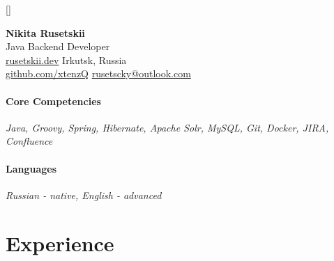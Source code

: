 \documentclass[10pt]{article}
\begin{document}
\titleformat{\section}{\vspace{-8pt}\scshape\raggedright\Large}{}{0em}{}[\color{black}\titlerule \vspace{-8pt}]


\noindent
\Large{\textbf{Nikita Rusetskii}}\vspace{4pt}
\\
\large{Java Backend Developer}\vspace{4pt}
\\
\normalsize\href{https://rusetskii.dev/}{rusetskii.dev}\normalsize
\hfill Irkutsk, Russia
\\
\href{https://github.com/xtenzQ}{github.com/xtenzQ}
\hfill
\href{mailto:rusetscky@outlook.com}{rusetscky@outlook.com}

\paragraph{\noindent\textbf{Core Competencies}\vspace{1pt}}\mbox{}\par\nobreak\noindent
\textit{Java, Groovy, Spring, Hibernate, Apache Solr, MySQL, Git, Docker, JIRA, Confluence}

\paragraph{\noindent\textbf{Languages}\vspace{1pt}}\mbox{}\par\nobreak\noindent
\textit{Russian - native, English - advanced}



\section{Experience}
\paragraph{}
\end{document}
